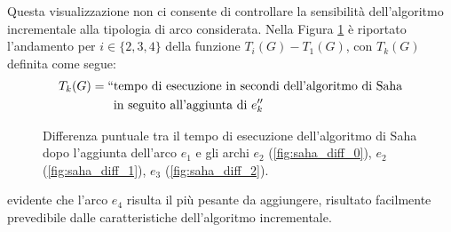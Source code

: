 Questa visualizzazione non ci consente di controllare la sensibilità dell'algoritmo incrementale alla tipologia di arco considerata. Nella Figura \ref{fig:saha_depends_cycle} è riportato l'andamento per $i \in \{2,3,4\}$ della funzione $T_i(G) - T_1(G)$, con $T_k(G)$ definita come segue:
\begin{align*}
    T_k(G) = ``&\text{tempo di esecuzione in secondi dell'algoritmo di Saha}\\
    &\text{in seguito all'aggiunta di } e_k''
\end{align*}

\begin{figure}[H]
    \caption{Differenza puntuale tra il tempo di esecuzione dell'algoritmo di Saha dopo l'aggiunta dell'arco $e_1$ e gli archi $e_2$ (\ref*{fig:saha_diff_0}), $e_2$ (\ref*{fig:saha_diff_1}), $e_3$ (\ref*{fig:saha_diff_2}).}
    \label{fig:saha_depends_cycle}
\end{figure}

\accente evidente che l'arco $e_4$ risulta il più pesante da aggiungere, risultato facilmente prevedibile dalle caratteristiche dell'algoritmo incrementale.

